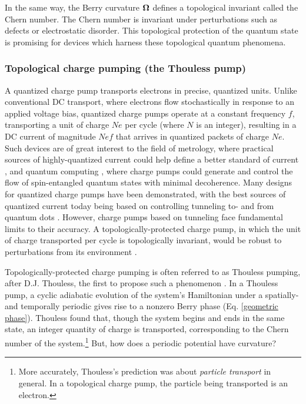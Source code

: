 \documentclass[double,12pt,1in]{beavtex}
\begin{document}
\begin{figure}
    \label{surfaces}
\end{figure}

In the same way, the Berry curvature $\vectorbold{\Omega}$ defines a topological invariant called the Chern number. The Chern number is invariant under perturbations such as defects or electrostatic disorder. This topological protection of the quantum state is promising for devices which harness these topological quantum phenomena. 

\subsubsection{Topological charge pumping (the Thouless pump)}

A quantized charge pump transports electrons in precise, quantized units. Unlike conventional DC transport, where electrons flow stochastically in response to an applied voltage bias, quantized charge pumps operate at a constant frequency $f$, transporting a unit of charge $Ne$ per cycle (where $N$ is an integer), resulting in a DC current of magnitude $Nef$ that arrives in quantized packets of charge $Ne$. Such devices are of great interest to the field of metrology, where practical sources of highly-quantized current could help define a better standard of current \cite{pekola_single-electron_2013,scherer_singleelectron_2019}, and quantum computing \cite{das_controlled_2006}, where charge pumps could generate and control the flow of spin-entangled quantum states with minimal decoherence. Many designs for quantized charge pumps have been demonstrated, with the best sources of quantized current today being based on controlling tunneling to- and from quantum dots \cite{scherer_singleelectron_2019}. However, charge pumps based on tunneling face fundamental limits to their accuracy. A topologically-protected charge pump, in which the unit of charge transported per cycle is topologically invariant, would be robust to perturbations from its environment \cite{niu_towards_1990}. 

Topologically-protected charge pumping is often referred to as Thouless pumping, after D.J. Thouless, the first to propose such a phenomenon \cite{thouless_quantization_1983}. In a Thouless pump, a cyclic adiabatic evolution of the system's Hamiltonian under a spatially- and temporally periodic gives rise to a nonzero Berry phase (Eq. \ref{geometric phase}). Thouless found that, though the system begins and ends in the same state, an integer quantity of charge is transported, corresponding to the Chern number of the system.\footnote{More accurately, Thouless's prediction was about \textit{particle transport} in general. In a topological charge pump, the particle being transported is an electron.} But, how does a periodic potential have curvature?  
\end{document}
